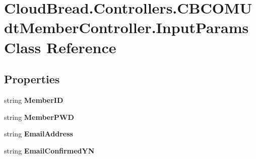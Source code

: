 \hypertarget{class_cloud_bread_1_1_controllers_1_1_c_b_c_o_m_udt_member_controller_1_1_input_params}{}\section{Cloud\+Bread.\+Controllers.\+C\+B\+C\+O\+M\+Udt\+Member\+Controller.\+Input\+Params Class Reference}
\label{class_cloud_bread_1_1_controllers_1_1_c_b_c_o_m_udt_member_controller_1_1_input_params}
\subsection*{Properties}
\begin{DoxyCompactItemize}
\item 
string {\bfseries Member\+ID}\hypertarget{class_cloud_bread_1_1_controllers_1_1_c_b_c_o_m_udt_member_controller_1_1_input_params_a0adec4b59646ca3c4151fb2f3d30ea4e}{}\label{class_cloud_bread_1_1_controllers_1_1_c_b_c_o_m_udt_member_controller_1_1_input_params_a0adec4b59646ca3c4151fb2f3d30ea4e}

\item 
string {\bfseries Member\+P\+WD}\hypertarget{class_cloud_bread_1_1_controllers_1_1_c_b_c_o_m_udt_member_controller_1_1_input_params_a4704abfb386af61b2c81f71281cef35a}{}\label{class_cloud_bread_1_1_controllers_1_1_c_b_c_o_m_udt_member_controller_1_1_input_params_a4704abfb386af61b2c81f71281cef35a}

\item 
string {\bfseries Email\+Address}\hypertarget{class_cloud_bread_1_1_controllers_1_1_c_b_c_o_m_udt_member_controller_1_1_input_params_a7620c76a3069913dde3cc2edf32d8eb7}{}\label{class_cloud_bread_1_1_controllers_1_1_c_b_c_o_m_udt_member_controller_1_1_input_params_a7620c76a3069913dde3cc2edf32d8eb7}

\item 
string {\bfseries Email\+Confirmed\+YN}\hypertarget{class_cloud_bread_1_1_controllers_1_1_c_b_c_o_m_udt_member_controller_1_1_input_params_a9ef0d983af47a17bf85ca05566fd1da1}{}\label{class_cloud_bread_1_1_controllers_1_1_c_b_c_o_m_udt_member_controller_1_1_input_params_a9ef0d983af47a17bf85ca05566fd1da1}


\end{DoxyCompactItemize}
